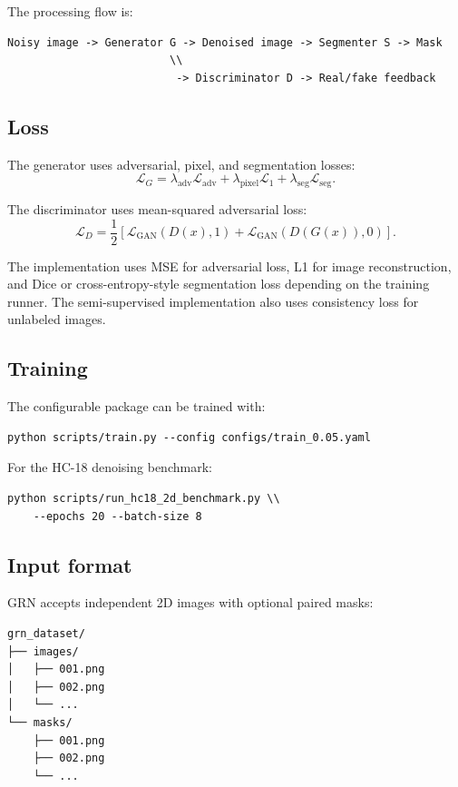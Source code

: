 \documentclass[11pt,a4paper]{article}
\begin{document}
The processing flow is:
\begin{verbatim}
Noisy image -> Generator G -> Denoised image -> Segmenter S -> Mask
                         \\
                          -> Discriminator D -> Real/fake feedback
\end{verbatim}

\subsection{Loss}
The generator uses adversarial, pixel, and segmentation losses:
\begin{equation}
    \mathcal{L}_{G}
    = \lambda_{\mathrm{adv}}\mathcal{L}_{\mathrm{adv}}
    + \lambda_{\mathrm{pixel}}\mathcal{L}_{1}
    + \lambda_{\mathrm{seg}}\mathcal{L}_{\mathrm{seg}}.
\end{equation}

The discriminator uses mean-squared adversarial loss:
\begin{equation}
    \mathcal{L}_{D}
    = \frac{1}{2}\left[
    \mathcal{L}_{\mathrm{GAN}}(D(x),1)
    + \mathcal{L}_{\mathrm{GAN}}(D(G(x)),0)
    \right].
\end{equation}

The implementation uses MSE for adversarial loss, L1 for image reconstruction, and Dice or cross-entropy-style segmentation loss depending on the training runner. The semi-supervised implementation also uses consistency loss for unlabeled images.

\subsection{Training}
The configurable package can be trained with:
\begin{verbatim}
python scripts/train.py --config configs/train_0.05.yaml
\end{verbatim}

For the HC-18 denoising benchmark:
\begin{verbatim}
python scripts/run_hc18_2d_benchmark.py \\
    --epochs 20 --batch-size 8
\end{verbatim}

\subsection{Input format}
GRN accepts independent 2D images with optional paired masks:
\begin{verbatim}
grn_dataset/
├── images/
│   ├── 001.png
│   ├── 002.png
│   └── ...
└── masks/
    ├── 001.png
    ├── 002.png
    └── ...
\end{verbatim}
\end{document}
